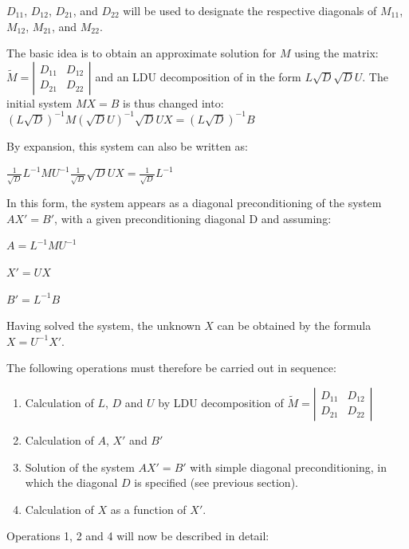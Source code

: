 $D_{11}$, $D_{12}$, $D_{21}$, and $D_{22}$ will be used to designate the
respective diagonals of $M_{11}$, $M_{12}$, $M_{21}$, and $M_{22}$.


The basic idea is to obtain an approximate solution for $M$ using the matrix:
$\tilde{M} =
\left|\begin{array}{cc}
  {D_{11} } & {D_{12} } \\
  {D_{21} } & {D_{22}
} \end{array}\right|$
and an LDU decomposition of  in the form $L\sqrt{D} \sqrt{D} U$. The initial
system $MX=B$ is thus changed into:
$\left(L\sqrt{D} \right)^{-1} M\left(\sqrt{D}  U\right)^{-1} \sqrt{D}  U
X=\left(L\sqrt{D} \right)^{-1}  B$

By expansion, this system can also be written as:

$\frac{1}{\sqrt{D}} L^{-1}MU^{-1} \frac{1}{\sqrt{D}} \sqrt{D} UX = \frac{1}{\sqrt{D}} L^{-1}$

In this form, the system appears as a diagonal preconditioning of the system
$AX' = B'$, with a given preconditioning diagonal D and assuming:

$A = L^{-1} M U^{-1}$

$X' = U X$

$B' = L^{-1} B$

Having solved the system, the unknown $X$ can be obtained by the formula
$X =U^{-1} X'$.

The following operations must therefore be carried out in sequence:
\begin{enumerate}
  \item Calculation of $L$, $D$ and $U$ by LDU decomposition of
  $\tilde{M}=\left|\begin{array}{cc} {D_{11} } & {D_{12} } \\ {D_{21} } &
  {D_{22} } \end{array}\right|$
  \item Calculation of $A$, $X'$ and $B'$
  \item Solution of the system $A X' = B'$ with simple diagonal preconditioning,
    in which the diagonal $D$ is specified (see previous section).
  \item Calculation of $X$ as a function of $X'$.
\end{enumerate}

Operations 1, 2 and 4 will now be described in detail:


